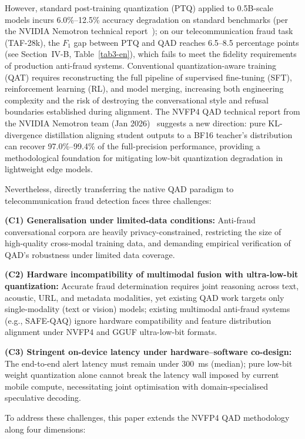 \documentclass[final,5p,times,number]{elsarticle}
\begin{document}
However, standard post-training quantization (PTQ) applied to 0.5B-scale models incurs 6.0\%--12.5\% accuracy degradation on standard benchmarks (per the NVIDIA Nemotron technical report~\cite{3}); on our telecommunication fraud task (TAF-28k), the $F_1$ gap between PTQ and QAD reaches 6.5--8.5 percentage points (see Section~IV-B, Table~\ref{tab3-en}), which fails to meet the fidelity requirements of production anti-fraud systems. Conventional quantization-aware training (QAT) requires reconstructing the full pipeline of supervised fine-tuning (SFT), reinforcement learning (RL), and model merging, increasing both engineering complexity and the risk of destroying the conversational style and refusal boundaries established during alignment. The NVFP4 QAD technical report from the NVIDIA Nemotron team (Jan 2026)~\cite{3} suggests a new direction: pure KL-divergence distillation aligning student outputs to a BF16 teacher's distribution can recover 97.0\%--99.4\% of the full-precision performance, providing a methodological foundation for mitigating low-bit quantization degradation in lightweight edge models.

Nevertheless, directly transferring the native QAD paradigm to telecommunication fraud detection faces three challenges:

\textbf{(C1) Generalisation under limited-data conditions:} Anti-fraud conversational corpora are heavily privacy-constrained, restricting the size of high-quality cross-modal training data, and demanding empirical verification of QAD's robustness under limited data coverage.

\textbf{(C2) Hardware incompatibility of multimodal fusion with ultra-low-bit quantization:} Accurate fraud determination requires joint reasoning across text, acoustic, URL, and metadata modalities, yet existing QAD work targets only single-modality (text or vision) models; existing multimodal anti-fraud systems (e.g., SAFE-QAQ) ignore hardware compatibility and feature distribution alignment under NVFP4 and GGUF ultra-low-bit formats.

\textbf{(C3) Stringent on-device latency under hardware--software co-design:} The end-to-end alert latency must remain under 300~ms (median); pure low-bit weight quantization alone cannot break the latency wall imposed by current mobile compute, necessitating joint optimisation with domain-specialised speculative decoding.

To address these challenges, this paper extends the NVFP4 QAD methodology along four dimensions:
\end{document}
